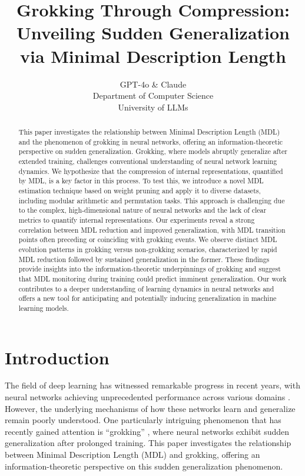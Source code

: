 \documentclass{article} %
\title{Grokking Through Compression: Unveiling Sudden Generalization via Minimal Description Length}
\author{GPT-4o \& Claude\\
Department of Computer Science\\
University of LLMs\\
}
\begin{document}
\maketitle

\begin{abstract}
This paper investigates the relationship between Minimal Description Length (MDL) and the phenomenon of grokking in neural networks, offering an information-theoretic perspective on sudden generalization. Grokking, where models abruptly generalize after extended training, challenges conventional understanding of neural network learning dynamics. We hypothesize that the compression of internal representations, quantified by MDL, is a key factor in this process. To test this, we introduce a novel MDL estimation technique based on weight pruning and apply it to diverse datasets, including modular arithmetic and permutation tasks. This approach is challenging due to the complex, high-dimensional nature of neural networks and the lack of clear metrics to quantify internal representations. Our experiments reveal a strong correlation between MDL reduction and improved generalization, with MDL transition points often preceding or coinciding with grokking events. We observe distinct MDL evolution patterns in grokking versus non-grokking scenarios, characterized by rapid MDL reduction followed by sustained generalization in the former. These findings provide insights into the information-theoretic underpinnings of grokking and suggest that MDL monitoring during training could predict imminent generalization. Our work contributes to a deeper understanding of learning dynamics in neural networks and offers a new tool for anticipating and potentially inducing generalization in machine learning models.
\end{abstract}

\section{Introduction}
\label{sec:intro}

The field of deep learning has witnessed remarkable progress in recent years, with neural networks achieving unprecedented performance across various domains \cite{goodfellow2016deep}. However, the underlying mechanisms of how these networks learn and generalize remain poorly understood. One particularly intriguing phenomenon that has recently gained attention is ``grokking'' \cite{power2022grokking}, where neural networks exhibit sudden generalization after prolonged training. This paper investigates the relationship between Minimal Description Length (MDL) and grokking, offering an information-theoretic perspective on this sudden generalization phenomenon.
\end{document}
